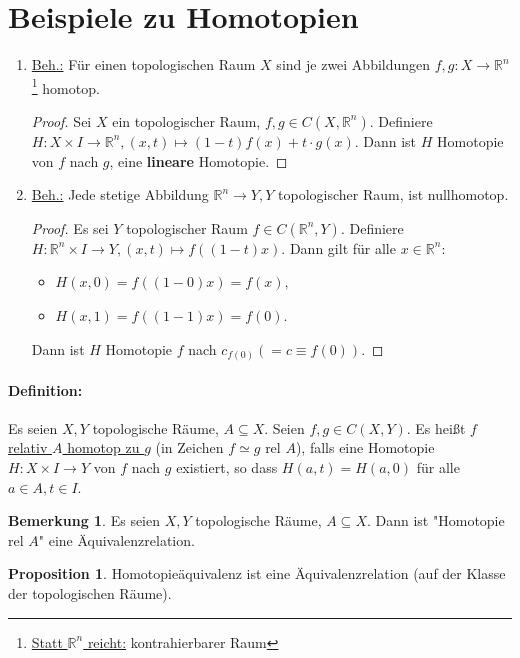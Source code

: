 \documentclass[a4paper,11pt,notitlepage]{report}
\theoremstyle{definition}
\newtheorem{proposition}{Proposition}[chapter]
\newtheorem{remark}{Bemerkung}[chapter]
\newcommand{\R}{{\ensuremath{\mathbb{R}}}}
\begin{document}
\section{Beispiele zu Homotopien}
\begin{enumerate}
	\item \underline{Beh.:} Für einen topologischen Raum $X$ sind je zwei Abbildungen $f,g \colon X \rightarrow \R^n$ \footnote{\underline{Statt $\R^n$ reicht:} kontrahierbarer Raum} homotop.
	\begin{proof}
		Sei $X$ ein topologischer Raum, $f,g \in C(X,\R^n)$.
		Definiere $H \colon X \times I \rightarrow \R^n, (x,t) \mapsto (1-t)f(x) + t \cdot g(x)$.
		Dann ist $H$ Homotopie von $f$ nach $g$, eine \textbf{lineare} Homotopie.
	\end{proof}
	
	\item \underline{Beh.:} Jede stetige Abbildung $\R^n \rightarrow Y, Y$ topologischer Raum, ist nullhomotop.
	\begin{proof}
		Es sei $Y$ topologischer Raum $f \in C(\R^n,Y)$.
		Definiere $H \colon \R^n \times I \rightarrow Y, (x,t) \mapsto f((1-t)x).$
		Dann gilt für alle $x \in \R^n:$
		\begin{itemize}
			\item $H(x,0)=f((1-0)x) = f(x),$
			\item $H(x,1)=f((1-1)x) = f(0).$
		\end{itemize}
		Dann ist $H$ Homotopie $f$ nach $c_{f(0)} (=c \equiv f(0)).$
	\end{proof}
\end{enumerate}

\paragraph{Definition:} Es seien $X,Y$ topologische Räume, $A \subseteq X$. Seien $f,g \in C(X,Y).$
Es heißt \underline{$f$ relativ $A$ homotop zu $g$} (in Zeichen $f \simeq g \text{ rel } A$), falls eine Homotopie $H \colon X \times I \rightarrow Y$ von $f$ nach $g$ existiert, so dass $H(a,t)=H(a,0)$ für alle $a \in A, t \in I$.

\begin{remark}{} Es seien $X,Y$ topologische Räume, $A \subseteq X$. Dann ist "Homotopie rel $A$" eine Äquivalenzrelation.
\end{remark}

\begin{proposition} Homotopieäquivalenz ist eine Äquivalenzrelation (auf der Klasse der topologischen Räume).
\end{proposition}
\end{document}
